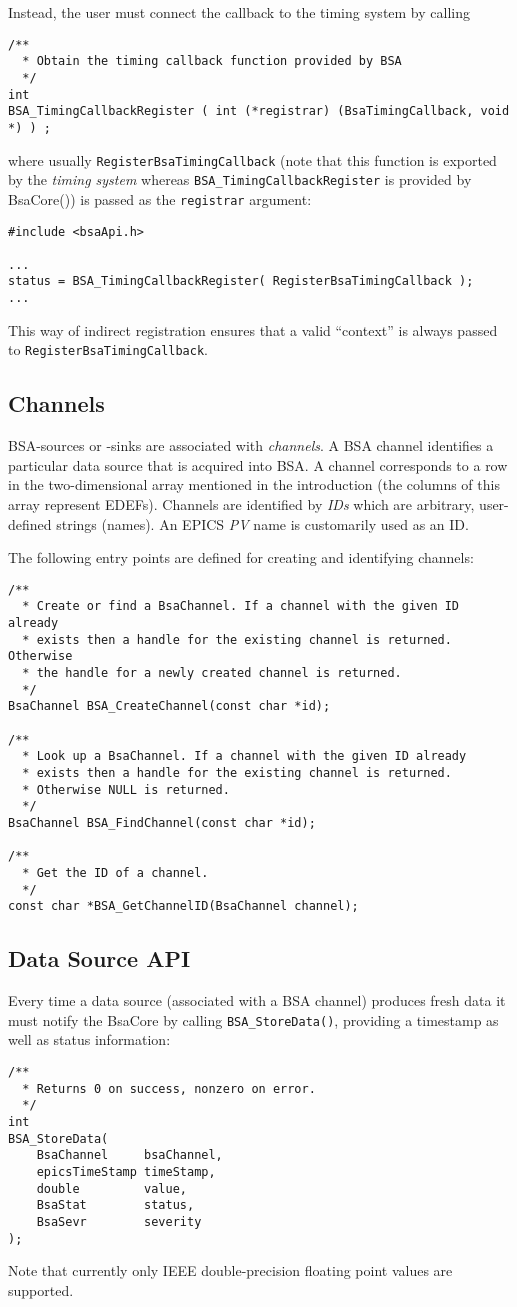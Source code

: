 \documentclass[11pt]{article}
\newcommand{\bsac}{BsaCore}
\newcommand{\bsa} {BSA}
\newcommand{\EDEF}{EDEF}
\newcommand{\cod}[1]{{\tt#1}}
\begin{document}
Instead, the user must connect the callback to the timing system by calling
\begin{lstlisting}
/**
  * Obtain the timing callback function provided by BSA
  */
int
BSA_TimingCallbackRegister ( int (*registrar) (BsaTimingCallback, void *) ) ;
\end{lstlisting}
where usually \cod{RegisterBsaTimingCallback} (note that this function is exported by
the {\em timing system} whereas \cod{BSA\_TimingCallbackRegister} is provided by \bsac())
is passed as the \cod{registrar} argument:
\begin{lstlisting}
#include <bsaApi.h>

...
status = BSA_TimingCallbackRegister( RegisterBsaTimingCallback );
...
\end{lstlisting}
This way of indirect registration ensures that a valid ``context'' is always
passed to \cod{RegisterBsaTimingCallback}.
\subsection{Channels}
\bsa{}-sources or -sinks are associated with {\em channels}. A \bsa{} channel
identifies a particular data source that is acquired into \bsa. A channel
corresponds to a row in the two-dimensional array mentioned in the introduction
(the columns of this array represent \EDEF{}s). Channels are identified by {\em IDs}
which are arbitrary, user-defined strings (names). An EPICS {\em PV} name is customarily
used as an ID.

The following entry points are defined for creating and identifying channels:
\begin{lstlisting}
/**
  * Create or find a BsaChannel. If a channel with the given ID already
  * exists then a handle for the existing channel is returned. Otherwise
  * the handle for a newly created channel is returned.
  */
BsaChannel BSA_CreateChannel(const char *id);

/**
  * Look up a BsaChannel. If a channel with the given ID already
  * exists then a handle for the existing channel is returned.
  * Otherwise NULL is returned.
  */
BsaChannel BSA_FindChannel(const char *id);

/**
  * Get the ID of a channel.
  */
const char *BSA_GetChannelID(BsaChannel channel);
\end{lstlisting}

\subsection{Data Source API}
Every time a data source (associated with a \bsa{} channel) produces fresh
data it must notify the \bsac{} by calling \cod{BSA\_StoreData()}, providing
a timestamp as well as status information:
\begin{lstlisting}
/**
  * Returns 0 on success, nonzero on error.
  */
int
BSA_StoreData(
    BsaChannel     bsaChannel,
    epicsTimeStamp timeStamp,
    double         value,
    BsaStat        status,
    BsaSevr        severity
);
\end{lstlisting}
Note that currently only IEEE double-precision floating point values are supported.
\end{document}
